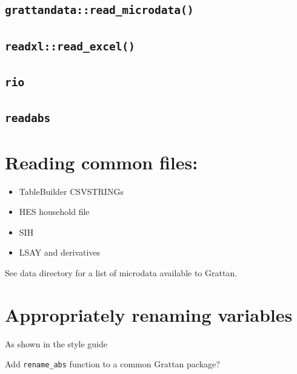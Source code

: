 \documentclass[]{book}
\providecommand{\tightlist}{%
  \setlength{\itemsep}{0pt}\setlength{\parskip}{0pt}}
\begin{document}
\hypertarget{read_microdata}{%
\subsection{\texorpdfstring{\texttt{grattandata::read\_microdata()}}{grattandata::read\_microdata()}}\label{read_microdata}}

\hypertarget{readxlread_excel}{%
\subsection{\texorpdfstring{\texttt{readxl::read\_excel()}}{readxl::read\_excel()}}\label{readxlread_excel}}

\hypertarget{rio}{%
\subsection{\texorpdfstring{\texttt{rio}}{rio}}\label{rio}}

\hypertarget{readabs}{%
\subsection{\texorpdfstring{\texttt{readabs}}{readabs}}\label{readabs}}

\hypertarget{reading-common-files}{%
\section{Reading common files:}\label{reading-common-files}}

\begin{itemize}
\tightlist
\item
  TableBuilder CSVSTRINGs
\item
  HES household file
\item
  SIH
\item
  LSAY and derivatives
\end{itemize}

See data directory for a list of microdata available to Grattan.

\hypertarget{appropriately-renaming-variables}{%
\section{Appropriately renaming variables}\label{appropriately-renaming-variables}}

As shown in the style guide

Add \texttt{rename\_abs} function to a common Grattan package?
\end{document}
